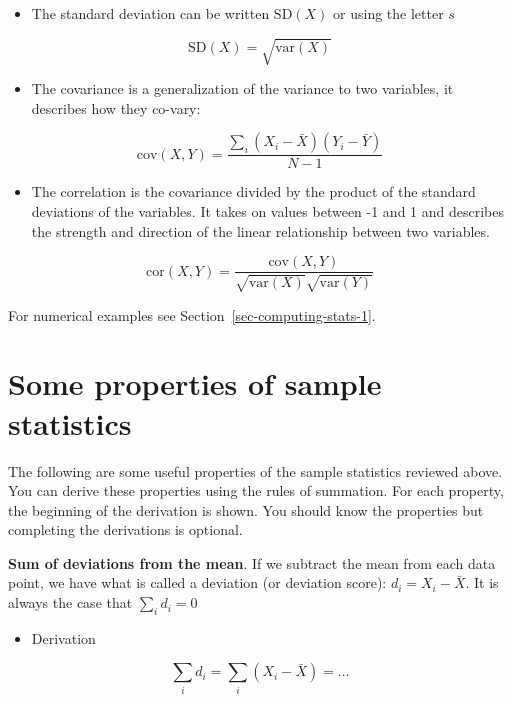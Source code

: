 \documentclass[
  letterpaper,
  DIV=11,
  numbers=noendperiod]{scrreprt}
\providecommand{\tightlist}{%
  \setlength{\itemsep}{0pt}\setlength{\parskip}{0pt}}\usepackage{longtable,booktabs,array}
\begin{document}
\begin{itemize}
\tightlist
\item
  The standard deviation can be written \(\text{SD}(X)\) or using the
  letter \(s\)
\end{itemize}

\[ \text{SD}(X) = \sqrt{\text{var}(X)} \]

\begin{itemize}
\tightlist
\item
  The covariance is a generalization of the variance to two variables,
  it describes how they co-vary:
\end{itemize}

\[\text{cov}(X, Y) = \frac{\sum_i (X_i - \bar X) (Y_i - \bar Y)}{N - 1} \]

\begin{itemize}
\tightlist
\item
  The correlation is the covariance divided by the product of the
  standard deviations of the variables. It takes on values between -1
  and 1 and describes the strength and direction of the linear
  relationship between two variables.
\end{itemize}

\[\text{cor}(X, Y) = \frac{\text{cov}(X, Y)}{\sqrt{\text{var}(X)} \sqrt{\text{var}(Y)}} \]

For numerical examples see Section~\ref{sec-computing-stats-1}.

\hypertarget{sec-properties-1}{%
\section{Some properties of sample statistics}\label{sec-properties-1}}

The following are some useful properties of the sample statistics
reviewed above. You can derive these properties using the rules of
summation. For each property, the beginning of the derivation is shown.
You should know the properties but completing the derivations is
optional.

\textbf{Sum of deviations from the mean}. If we subtract the mean from
each data point, we have what is called a deviation (or deviation
score): \(d_i = X_i - \bar X\). It is always the case that
\(\sum_i d_i = 0\)

\begin{itemize}
\tightlist
\item
  Derivation
\end{itemize}

\[ \sum_i d_i = \sum_i(X_i - \bar X) = \dots \]
\end{document}

